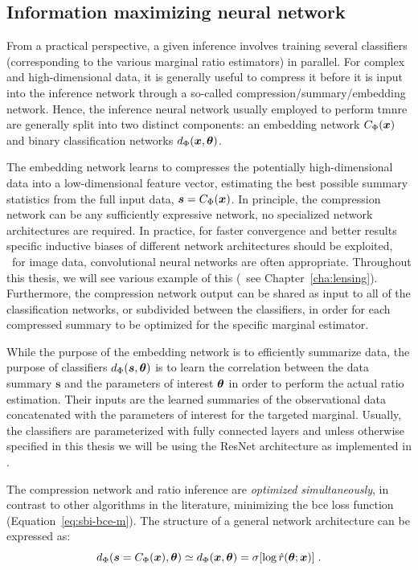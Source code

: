 \subsection{Information maximizing neural network} \label{subsec:tmnre-nn}

From a practical perspective, a given inference involves training several classifiers (corresponding to the various marginal ratio estimators) in parallel. For complex and high-dimensional data, it is generally useful to compress it before it is input into the inference network through a so-called compression/summary/embedding network. Hence, the inference neural network usually employed to perform \gls*{tmnre} are generally split into two distinct components: an embedding network $C_\Phi(\bm{x})$ and binary classification networks $d_\Phi(\bm{x}, \bm{\theta})$. 

The embedding network learns to compresses the potentially high-dimensional data into a low-dimensional feature vector, estimating the best possible summary statistics from the full input data, $\boldsymbol{s}= C_\Phi(\bm{x})$. In principle, the compression network can be any sufficiently expressive network, no specialized network architectures are required. In practice, for faster convergence and better results specific inductive biases of different network architectures should be exploited, \eg~for image data, convolutional neural networks are often appropriate. Throughout this thesis, we will see various example of this (\eg~see Chapter~\ref{cha:lensing}). Furthermore, the compression network output can be shared as input to all of the classification networks, or subdivided between the classifiers, in order for each compressed summary to be optimized for the specific marginal estimator. 

While the purpose of the embedding network is to efficiently summarize data, the purpose of classifiers $d_\Phi(\boldsymbol{s}, \bm{\theta})$ is to learn the correlation between the data summary $\boldsymbol{s}$ and the parameters of interest $\bm{\theta}$ in order to perform the actual ratio estimation. Their inputs are the learned summaries of the observational data concatenated with the parameters of interest for the targeted marginal. Usually, the classifiers are parameterized with fully connected layers and unless otherwise specified in this thesis we will be using the ResNet \cite{he2016deep} architecture as implemented in \swyft \cite{Miller2022}.

The compression network and ratio inference are \emph{optimized simultaneously}, in contrast to other algorithms in the literature, minimizing the \gls*{bce} loss function (Equation~\eqref{eq:sbi-bce-m}). The structure of a general network architecture can be expressed as:
\begin{equation}\label{eq:nn-c}
    d_\Phi(\boldsymbol{s}= C_\Phi(\bm{x}), \bm{\theta}) \simeq  d_\Phi(\bm{x}, \bm{\theta})  = \sigma[ \log \hat{r}(\bm{\theta}; \bm{x})] \;.
\end{equation}

